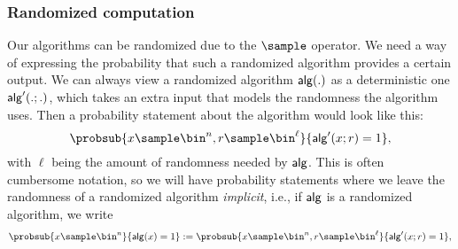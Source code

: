 \subsubsection{Randomized computation}\label{sssec:randomized-algorithms}
Our algorithms can be randomized due to the $\sample$ operator. We need a way of expressing the probability that such a randomized algorithm provides a certain output. We can always view a randomized algorithm $\mathsf{alg}(.)$ as a deterministic one $\mathsf{alg}'(.;.)$, which takes an extra input that models the randomness the algorithm uses. Then a probability statement about the algorithm would look like this:
\[\probsub{x\sample \bin^n,r\sample\bin^\ell}{\alg'(x;r)=1},\]
with $\ell$ being the amount of randomness needed by $\mathsf{alg}$. This is often cumbersome notation, so we will have probability statements where we leave the randomness of a randomized algorithm \emph{implicit}, i.e., if $\mathsf{alg}$ is a randomized algorithm, we write
\[\probsub{x\sample \bin^n}{\alg(x)=1}:=
  \probsub{x\sample \bin^n,r\sample\bin^\ell}{\alg'(x;r)=1},\]